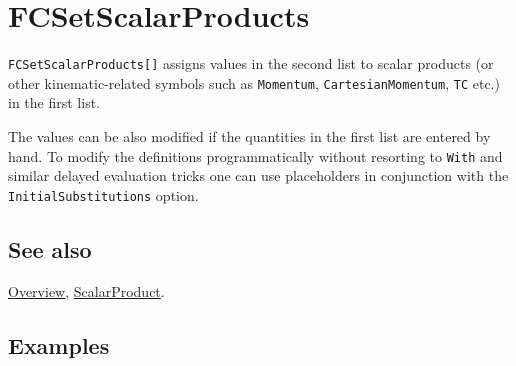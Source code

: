 \documentclass[../FeynCalcManual.tex]{subfiles}
\begin{document}
\hypertarget{fcsetscalarproducts}{%
\section{FCSetScalarProducts}\label{fcsetscalarproducts}}

\texttt{FCSetScalarProducts[\allowbreak{}]} assigns values in the second
list to scalar products (or other kinematic-related symbols such as
\texttt{Momentum}, \texttt{CartesianMomentum}, \texttt{TC} etc.) in the
first list.

The values can be also modified if the quantities in the first list are
entered by hand. To modify the definitions programmatically without
resorting to \texttt{With} and similar delayed evaluation tricks one can
use placeholders in conjunction with the \texttt{InitialSubstitutions}
option.

\subsection{See also}

\hyperlink{toc}{Overview}, \hyperlink{scalarproduct}{ScalarProduct}.

\subsection{Examples}

\begin{Shaded}
\begin{Highlighting}[]
\OperatorTok{[]}\NormalTok{; }
 
\OperatorTok{[\{}\OperatorTok{[}\OperatorTok{],}\OperatorTok{[}\OperatorTok{],}\OperatorTok{[}\OperatorTok{,}\OperatorTok{]\},} \OperatorTok{\{}\OperatorTok{,}\OperatorTok{,}\OperatorTok{\}]}\NormalTok{;}
\end{Highlighting}
\end{Shaded}

\begin{Shaded}
\begin{Highlighting}[]
\OperatorTok{\{}\OperatorTok{[}\OperatorTok{],}\OperatorTok{[}\OperatorTok{],}\OperatorTok{[}\OperatorTok{,}\OperatorTok{]\}}
\end{Highlighting}
\end{Shaded}
\end{document}
